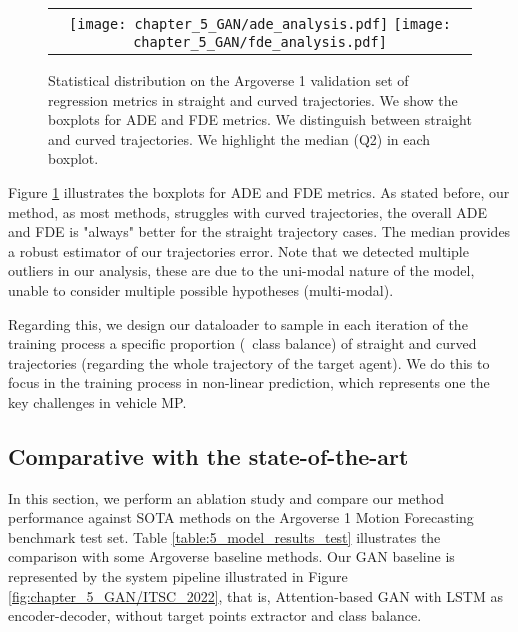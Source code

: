 \begin{figure}[!ht]
	\centering
	\setlength{\tabcolsep}{2.0pt}
	\begin{tabular}{c}
		\texttt{[image: chapter\_5\_GAN/ade\_analysis.pdf]} %
		\texttt{[image: chapter\_5\_GAN/fde\_analysis.pdf]}\tabularnewline
	\end{tabular}
	\caption[Statistical distribution on the Argoverse 1 validation set of regression metrics in straight and curved trajectories]{Statistical distribution on the Argoverse 1 validation set of regression metrics in straight and curved trajectories. We show the boxplots for \ac{ADE} and \ac{FDE} metrics. We distinguish between straight and curved trajectories. We highlight the median (Q2) in each boxplot.}
	\label{fig:chapter_5_GAN/boxplots}
\end{figure}

Figure \ref{fig:chapter_5_GAN/boxplots} illustrates the boxplots for \ac{ADE} and \ac{FDE} metrics. As stated before, our method, as most methods, struggles with curved trajectories, the overall \ac{ADE} and \ac{FDE} is "always" better for the straight trajectory cases. The median provides a robust estimator of our trajectories error. Note that we detected multiple outliers in our analysis, these are due to the uni-modal nature of the model, unable to consider multiple possible hypotheses (multi-modal). 

Regarding this, we design our dataloader to sample in each iteration of the training process a specific proportion (\ie \ class balance) of straight and curved trajectories (regarding the whole trajectory of the target agent). We do this to focus in the training process in non-linear prediction, which represents one the key challenges in vehicle \ac{MP}. 

\subsection{Comparative with the state-of-the-art}
\label{subsec:5_model_results}

In this section, we perform an ablation study and compare our method performance against \ac{SOTA} methods on the Argoverse 1 Motion Forecasting benchmark test set. Table \ref{table:5_model_results_test} illustrates the comparison with some Argoverse baseline methods. Our \ac{GAN} baseline is represented by the system pipeline illustrated in Figure \ref{fig:chapter_5_GAN/ITSC_2022}, that is, Attention-based \ac{GAN} with \ac{LSTM} as encoder-decoder, without target points extractor and class balance. 

